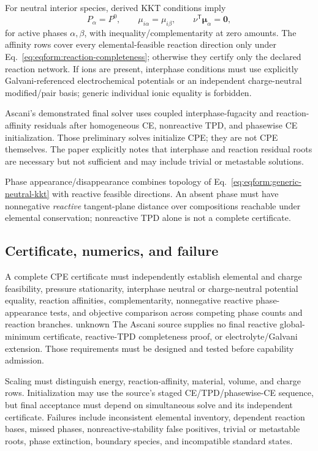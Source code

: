 \documentclass[11pt]{article}
\newcommand{\Evidence}[1]{\textsf{#1}}
\begin{document}
For neutral interior species, derived KKT conditions imply
\begin{equation}
 P_\alpha=P^0,\qquad
 \mu_{i\alpha}=\mu_{i\beta},\qquad
 \nu^\mathsf T\boldsymbol\mu_\alpha=\boldsymbol0,
\label{eq:eqform:cpe-kkt}
\end{equation}
for active phases \(\alpha,\beta\), with inequality/complementarity at zero
amounts. The affinity rows cover every elemental-feasible reaction direction
only under Eq.~\eqref{eq:eqform:reaction-completeness}; otherwise they certify
only the declared reaction network. If ions are present, interphase conditions
must use explicitly
Galvani-referenced electrochemical potentials or an independent charge-neutral
modified/pair basis; generic individual ionic equality is forbidden.

Ascani's demonstrated final solver uses coupled interphase-fugacity and
reaction-affinity residuals after homogeneous CE, nonreactive TPD, and
phasewise CE initialization. Those preliminary solves initialize CPE; they are
not CPE themselves. The paper explicitly notes that interphase and reaction
residual roots are necessary but not sufficient and may include trivial or
metastable solutions.

Phase appearance/disappearance combines topology of
Eq.~\eqref{eq:eqform:generic-neutral-kkt} with reactive feasible directions.
An absent phase must have nonnegative \emph{reactive} tangent-plane distance
over compositions reachable under elemental conservation; nonreactive TPD
alone is not a complete certificate.

\subsection{Certificate, numerics, and failure}

A complete CPE certificate must independently establish elemental and charge
feasibility, pressure stationarity, interphase neutral or charge-neutral
potential equality, reaction affinities, complementarity, nonnegative reactive
phase-appearance tests, and objective comparison across competing phase counts
and reaction branches. \Evidence{unknown} The Ascani source supplies no final
reactive global-minimum certificate, reactive-TPD completeness proof, or
electrolyte/Galvani extension. Those requirements must be designed and tested
before capability admission.

Scaling must distinguish energy, reaction-affinity, material, volume, and
charge rows. Initialization may use the source's staged CE/TPD/phasewise-CE
sequence, but final acceptance must depend on simultaneous solve and its
independent certificate. Failures include inconsistent elemental inventory,
dependent reaction bases, missed phases, nonreactive-stability false positives,
trivial or metastable roots, phase extinction, boundary species, and
incompatible standard states.
\end{document}
